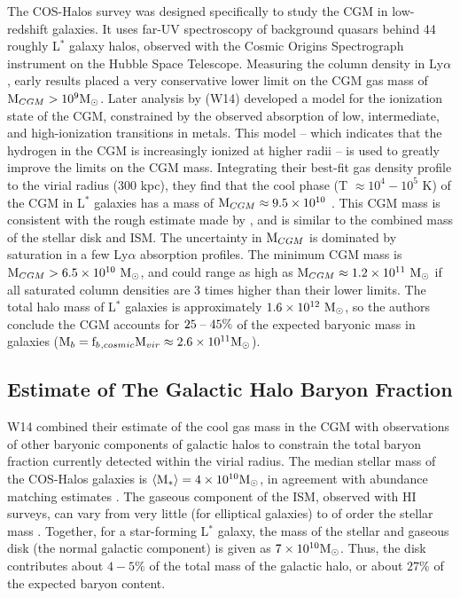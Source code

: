 The COS-Halos survey \citep{Tumlinson2011} was designed specifically
to study the CGM in low-redshift galaxies. It uses far-UV spectroscopy
of background quasars behind 44 roughly L$^*$ galaxy halos, observed
with the Cosmic Origins Spectrograph instrument on the Hubble Space
Telescope. Measuring the column density in Ly$\alpha$, early results
\citep{Thom2012,Werk2013} placed a very conservative lower limit on
the CGM gas mass of $\textrm{M}{}_{CGM} > 10^9 \textrm{M}_\odot{}$. Later analysis by
\textbf{\citet{Werk2014}} (W14) developed a model for the ionization
state of the CGM, constrained by the observed absorption of low,
intermediate, and high-ionization transitions in metals. This model --
which indicates that the hydrogen in the CGM is increasingly ionized
at higher radii -- is used to greatly improve the limits on the CGM
mass. Integrating their best-fit gas density profile to the virial
radius (300 kpc), they find that the cool phase (T $\approx 10^4 -
10^5$ K) of the CGM in L$^*$ galaxies has a mass of $\textrm{M}{}_{CGM}
\approx 9.5\times 10^{10}$ \Msun{}. This CGM mass is consistent with the
rough estimate made by \citet{Steidel2010}, and is similar to the
combined mass of the stellar disk and ISM. The uncertainty in
$\textrm{M}{}_{CGM}$ is dominated by saturation in a few Ly$\alpha$
absorption profiles. The minimum CGM mass is $\textrm{M}{}_{CGM} >
6.5\times 10^{10} ~\textrm{M}_\odot$, and could range as high as $\textrm{M}{}_{CGM}
\approx 1.2\times 10^{11}~\textrm{M}_\odot{}$ if all saturated column densities are 3
times higher than their lower limits. The total halo mass of L$^*$
galaxies is approximately $1.6\times 10^{12}~\textrm{M}_\odot{}$, so the authors
conclude the CGM accounts for $25\;\textrm{--}\;45\%$ of the expected baryonic
mass in galaxies ($\textrm{M}{}_{b} = \textrm{f\ensuremath{_b}}{}_{,cosmic} \textrm{M\ensuremath{_{vir}}}{} \approx
2.6\times 10^{11} \textrm{M}_\odot{}$).

\subsection{Estimate of The Galactic Halo Baryon Fraction}
\label{sec:Galaxy.Fraction}

W14 combined their estimate of the cool gas mass in the CGM with
observations of other baryonic components of galactic halos to
constrain the total baryon fraction currently detected within the
virial radius. The median stellar mass of the COS-Halos galaxies is
$\left<\textrm{M}{}_*\right> = 4\times 10^{10}\textrm{M}_\odot$, in agreement with
abundance matching estimates \citep{Behroozi2010}. The gaseous
component of the ISM, observed with HI surveys, can vary from very
little (for elliptical galaxies) to of order the stellar mass
\citep{McGaugh2010, Martin2010}. Together, for a star-forming L$^*$
galaxy, the mass of the stellar and gaseous disk (the normal galactic
component) is given as $7\times 10^{10}\textrm{M}_\odot{}$. Thus, the disk
contributes about $4-5\%$ of the total mass of the galactic halo, or
about $27\%$ of the expected baryon content.


